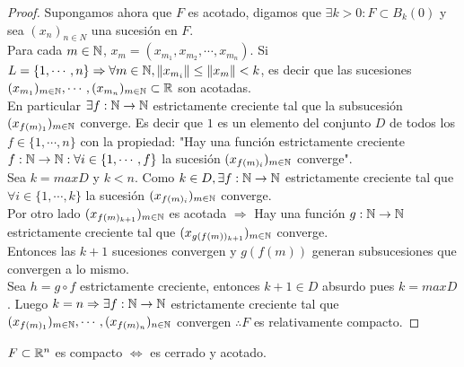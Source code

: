 \begin{prop}
\begin{proof}
    Supongamos ahora que $F$ es acotado, digamos que $\exists k > 0 : F \subset B_k(0)$ y sea $(x_n)_{n \in N}$ una sucesión en $F$. \\
    Para cada $m \in \mathbb{N}$, $x_m = (x_{m_1}, x_{m_2}, \cdots, x_{m_n})$. Si $L = \{1, \cdots, n\} \Rightarrow \forall m \in \mathbb{N}, \|x_{m_i}\| \leq \|x_m\| < k$, es decir que las sucesiones $(x_{m_1})_{m \in \mathbb{N}}, \cdots, (x_{m_n})_{m \in \mathbb{N}} \subset \mathbb{R}$ son acotadas. \\
    En particular $\exists f: \mathbb{N} \to \mathbb{N}$ estrictamente creciente tal que la subsucesión $(x_{f(m)_1})_{m \in \mathbb{N}}$ converge. Es decir que $1$ es un elemento del conjunto $D$ de todos los $f \in \{1, \cdots, n\}$ con la propiedad: "Hay una función estrictamente creciente $f: \mathbb{N} \to \mathbb{N} : \forall i \in \{1, \cdots, f\}$ la sucesión $(x_{f(m)_i})_{m \in \mathbb{N}}$ converge". \\
    Sea $k = maxD$ y $k < n$. Como $k \in D, \exists f: \mathbb{N} \to \mathbb{N}$ estrictamente creciente tal que $\forall i \in \{1, \cdots, k\}$ la sucesión $(x_{f(m)_i})_{m \in \mathbb{N}}$ converge. \\
    Por otro lado $(x_{f(m)_{k+1}})_{m \in \mathbb{N}}$ es acotada $\Rightarrow$ Hay una función $g: \mathbb{N} \to \mathbb{N}$ estrictamente creciente tal que $(x_{g(f(m))_{k+1}})_{m \in \mathbb{N}}$ converge. \\
    Entonces las $k+1$ sucesiones convergen y $g(f(m))$ generan subsucesiones que convergen a lo mismo. \\
    Sea $h = g \circ f$ estrictamente creciente, entonces $k+1 \in D$ absurdo pues $k = maxD$. Luego $k = n \Rightarrow \exists f: \mathbb{N} \to \mathbb{N}$ estrictamente creciente tal que \\
    $(x_{f(m)_1})_{m \in \mathbb{N}}, \cdots, (x_{f(m)_n})_{n \in \mathbb{N}}$ convergen $\therefore F$ es relativamente compacto.
  \end{proof}
\end{prop}

\begin{corollary}
  $F \subset \mathbb{R}^n$ es compacto $\iff$ es cerrado y acotado.
\end{corollary}